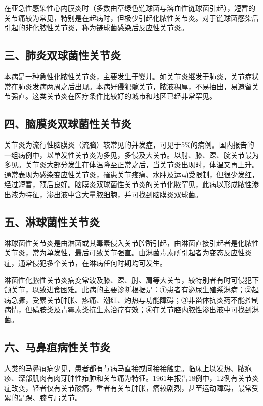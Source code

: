 在亚急性感染性心内膜炎时（多数由草绿色链球菌与溶血性链球菌引起），短暂的关节痛较为常见，特别是在起病时，但极少引起化脓性关节炎。对于链球菌感染后引起的非化脓性关节炎，称为链球菌感染后反应性关节炎。

\subsection{三、肺炎双球菌性关节炎}

本病是一种急性化脓性关节炎，主要发生于婴儿。如关节炎继发于肺炎，关节症状常在肺炎发病两周之后出现。本病好侵犯髋关节，脓液稠厚，不易抽出，易遗留关节强直。这类关节炎在医疗条件比较好的城市和地区已经非常罕见。

\subsection{四、脑膜炎双球菌性关节炎}

关节炎为流行性脑膜炎（流脑）较常见的并发症，可见于5\%的病例。国内报告的一组病例中，以单发性关节炎为多见，多侵及大关节。以肘、膝、踝、腕关节最为多见。关节炎大部分发生在体温降至正常之后，当关节炎出现时，体温又再上升。通常表现为感染变应性关节炎，罹患关节疼痛、水肿及运动受限制，但很少发红，经过短暂，预后良好。脑膜炎双球菌性关节炎的关节化脓罕见，此病以形成脓性渗出液为特征，渗出液中含大量脓细胞，并可找到脑膜炎双球菌。

\subsection{五、淋球菌性关节炎}

淋球菌性关节炎是由淋菌或其毒素侵入关节腔所引起，由淋菌直接引起者是化脓性关节炎，常为单发性，最后可致关节强直。由淋菌毒素所引起者为变态反应性炎症，通常侵犯多个关节，在淋病任何时期均可发生。

淋菌性化脓性关节炎病变常波及膝、踝、肘、肩等大关节，较特别者有时可侵犯下颌关节，以致进食困难。此病的主要诊断根据是：①患者有泌尿生殖系淋病；②起病急骤，受累关节肿胀、疼痛、潮红、灼热与功能障碍；③非甾体抗炎药不能控制病情，但磺胺类及青霉素类抗生素治疗有效；④在关节腔内脓性渗出液中可找到淋菌。

\subsection{六、马鼻疽病性关节炎}

人类的马鼻疽病少见，患者都有与病马直接或间接接触史。临床上以发热、脓疱疹、深部肌肉有肉芽肿性疖肿和关节痛为特征。1961年报告18例中，12例有关节炎症改变，轻者仅有关节酸痛，重者有关节肿胀，痛较剧烈，甚至运动障碍，最常受累的是踝、膝与肩关节。

